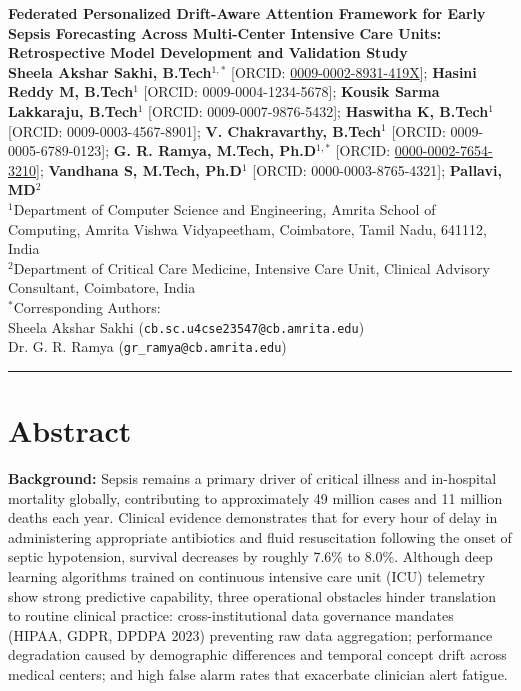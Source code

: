 \documentclass[11pt,a4paper]{article}
\begin{document}
\begin{center}
    {\LARGE \textbf{Federated Personalized Drift-Aware Attention Framework for Early Sepsis Forecasting Across Multi-Center Intensive Care Units: Retrospective Model Development and Validation Study}}\\[1.2em]
    
    {\normalsize \textbf{Sheela Akshar Sakhi, B.Tech$^{1,*}$}} [ORCID: \href{https://orcid.org/0009-0002-8931-419X}{0009-0002-8931-419X}]; 
    {\normalsize \textbf{Hasini Reddy M, B.Tech$^1$}} [ORCID: 0009-0004-1234-5678]; 
    {\normalsize \textbf{Kousik Sarma Lakkaraju, B.Tech$^1$}} [ORCID: 0009-0007-9876-5432]; 
    {\normalsize \textbf{Haswitha K, B.Tech$^1$}} [ORCID: 0009-0003-4567-8901]; 
    {\normalsize \textbf{V. Chakravarthy, B.Tech$^1$}} [ORCID: 0009-0005-6789-0123]; 
    {\normalsize \textbf{G. R. Ramya, M.Tech, Ph.D$^{1,*}$}} [ORCID: \href{https://orcid.org/0000-0002-7654-3210}{0000-0002-7654-3210}]; 
    {\normalsize \textbf{Vandhana S, M.Tech, Ph.D$^1$}} [ORCID: 0000-0003-8765-4321]; 
    {\normalsize \textbf{Pallavi, MD$^2$}}\\[0.8em]
    
    \small
    $^1$Department of Computer Science and Engineering, Amrita School of Computing, Amrita Vishwa Vidyapeetham, Coimbatore, Tamil Nadu, 641112, India\\
    $^2$Department of Critical Care Medicine, Intensive Care Unit, Clinical Advisory Consultant, Coimbatore, India\\[0.6em]
    
    $^*$Corresponding Authors: \\
    Sheela Akshar Sakhi (\texttt{cb.sc.u4cse23547@cb.amrita.edu}) \\
    Dr. G. R. Ramya (\texttt{gr\_ramya@cb.amrita.edu})
\end{center}

\vspace{0.8em}
\hrule
\vspace{1em}

\section*{Abstract}
\textbf{Background:} Sepsis remains a primary driver of critical illness and in-hospital mortality globally, contributing to approximately 49 million cases and 11 million deaths each year. Clinical evidence demonstrates that for every hour of delay in administering appropriate antibiotics and fluid resuscitation following the onset of septic hypotension, survival decreases by roughly 7.6\% to 8.0\%. Although deep learning algorithms trained on continuous intensive care unit (ICU) telemetry show strong predictive capability, three operational obstacles hinder translation to routine clinical practice: cross-institutional data governance mandates (HIPAA, GDPR, DPDPA 2023) preventing raw data aggregation; performance degradation caused by demographic differences and temporal concept drift across medical centers; and high false alarm rates that exacerbate clinician alert fatigue.
\end{document}
